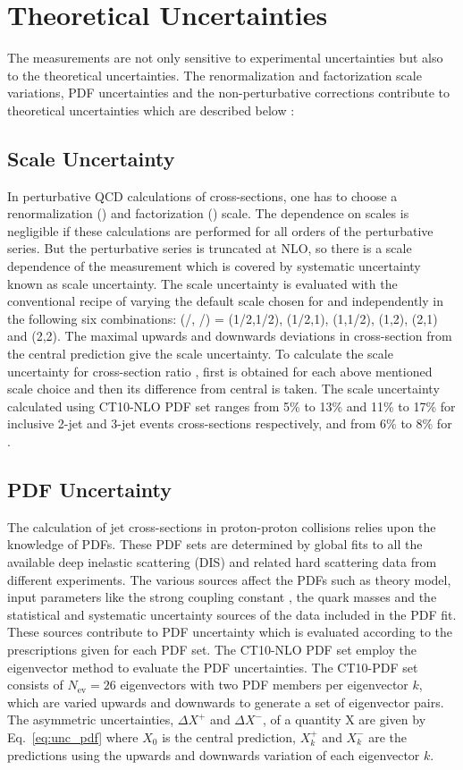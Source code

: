 \section{Theoretical Uncertainties}
\label{sec:theory_unc}
The measurements are not only sensitive to experimental uncertainties but also to the theoretical uncertainties. The renormalization and factorization scale variations, PDF uncertainties and the non-perturbative corrections contribute to theoretical uncertainties which are described below : 

\subsection{Scale Uncertainty}
\label{sec:scale_unc}
In perturbative QCD calculations of cross-sections, one has to choose a renormalization (\mur) and factorization (\muf) scale. The dependence on scales is negligible if these calculations are performed for all orders of the perturbative series. But the perturbative series is truncated at NLO, so there is a scale dependence of the measurement which is covered by systematic uncertainty known as scale uncertainty. The scale uncertainty is evaluated with the conventional recipe of varying the default scale \httwo chosen for \mur and \muf independently in the following six combinations: (\mur/\httwo, \muf/\httwo) = (1/2,1/2), (1/2,1), (1,1/2), (1,2), (2,1) and (2,2). The maximal upwards and downwards deviations in cross-section from the central prediction give the scale uncertainty. To calculate the scale uncertainty for cross-section ratio \ratio, first \ratio is obtained for each above mentioned scale choice and then its difference from central \ratio is taken. The scale uncertainty calculated using CT10-NLO PDF set ranges from 5\% to 13\% and 11\% to 17\% for inclusive 2-jet and 3-jet events cross-sections respectively, and from 6\% to 8\% for \ratio.

\subsection{PDF Uncertainty}
\label{sec:pdf_unc}
The calculation of jet cross-sections in proton-proton collisions relies upon the knowledge of PDFs. These PDF sets are determined by global fits to all the available deep inelastic scattering (DIS) and related hard scattering data from different experiments. The various sources affect the PDFs such as theory model, input parameters like the strong coupling constant \alpsns, the quark masses and the statistical and systematic uncertainty sources of the data included in the PDF fit. These sources contribute to PDF uncertainty which is evaluated according to the prescriptions given for each PDF set. The CT10-NLO PDF set \cite{Lai:2010vv,Pumplin:2002vw} employ the eigenvector method to evaluate the PDF uncertainties. The CT10-PDF set consists of $N_\mathrm{ev}=26$ eigenvectors with two PDF members per eigenvector $k$, which are varied upwards and downwards to generate a set of eigenvector pairs. The asymmetric uncertainties, $\Delta X^{+}$ and $\Delta X^{-}$, of a quantity X are given by Eq.~\ref{eq:unc_pdf} where $X_0$ is the central prediction, $X^{+}_k$ and $X^{-}_k$ are the predictions using the upwards and downwards variation of each eigenvector $k$. 

